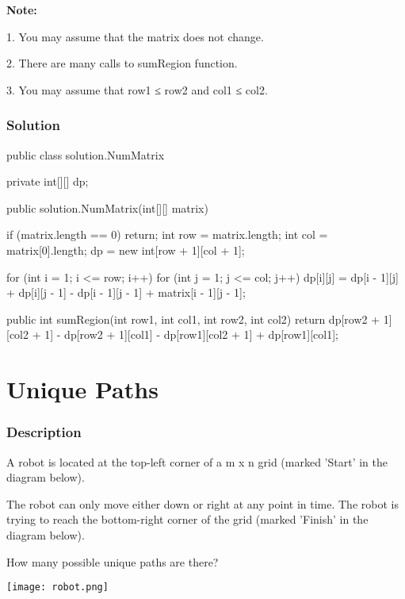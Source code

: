 \textbf{Note:}

1. You may assume that the matrix does not change.

2. There are many calls to sumRegion function.

3. You may assume that row1 ≤ row2 and col1 ≤ col2.

\subsubsection{Solution}

\begin{Code}
public class solution.NumMatrix {
    private int[][] dp;

    public solution.NumMatrix(int[][] matrix) {
        if (matrix.length == 0) {
            return;
        }
        int row = matrix.length;
        int col = matrix[0].length;
        dp = new int[row + 1][col + 1];

        for (int i = 1; i <= row; i++) {
            for (int j = 1; j <= col; j++) {
                dp[i][j] = dp[i - 1][j] + dp[i][j - 1] - dp[i - 1][j - 1] + matrix[i - 1][j - 1];
            }
        }
    }

    public int sumRegion(int row1, int col1, int row2, int col2) {
        return dp[row2 + 1][col2 + 1] - dp[row2 + 1][col1] - dp[row1][col2 + 1] + dp[row1][col1];
    }
}
\end{Code}

\newpage

\section{Unique Paths} %

\subsubsection{Description}
A robot is located at the top-left corner of a m x n grid (marked 'Start' in the diagram below).

The robot can only move either down or right at any point in time. The robot is trying to reach the bottom-right corner of the grid (marked 'Finish' in the diagram below).

How many possible unique paths are there?

\begin{center}
\texttt{[image: robot.png]}\\
\end{center}

